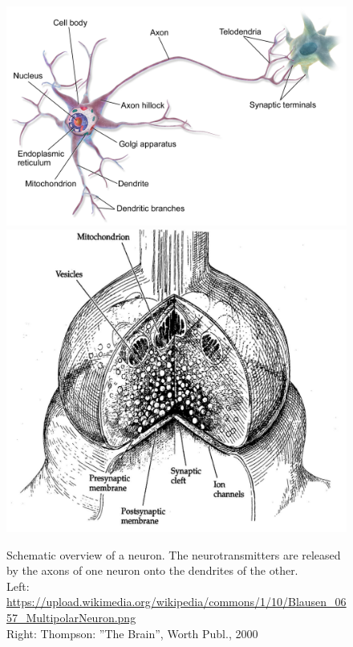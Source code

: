 \documentclass[twoside, 11pt]{article}
\begin{document}
	\begin{figure}
		\centering
		\includegraphics[scale=0.10]{Figures/Blausen_0657_MultipolarNeuron}%
		\includegraphics[scale=0.14]{Figures/synapse_drawing}
		\caption{Schematic overview of a neuron. The neurotransmitters are released by the axons of one neuron onto the dendrites of the other.\\ \scriptsize  Left: \url{https://upload.wikimedia.org/wikipedia/commons/1/10/Blausen_0657_MultipolarNeuron.png} \\
		Right: Thompson: ''The Brain'', Worth Publ., 2000}
		\label{fig: drawing neuron and synapse}
	\end{figure}
	
\end{document}
